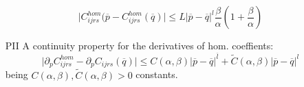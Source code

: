 \begin{prop}
\begin{enumerate}
    \begin{equation*}
        \vert C_{ijrs}^{hom}(\overline{p}-C^{hom}_{ijrs}(\overline{q}) \vert \leq L \vert \overline{p} - \overline{q} \vert^{l} \frac{\beta}{\alpha} (1+\frac{\beta}{\alpha})
    \end{equation*}
    \item[PII] A continuity property for the derivatives of hom. coeffients:
    \begin{equation*}
        \vert \partial_p C_{ijrs}^{hom}-\partial_p C_{ijrs}(\overline{q}) \vert \leq C(\alpha, \beta) \vert \overline{p}-\overline{q} \vert^{\overline{l}} + \tilde{C}(\alpha, \beta) \vert \overline{p}-\overline{q} \vert^{l}
    \end{equation*}
    being $C(\alpha,\beta), \tilde{C}(\alpha,\beta) > 0$ constants.
\end{enumerate}
\end{prop}